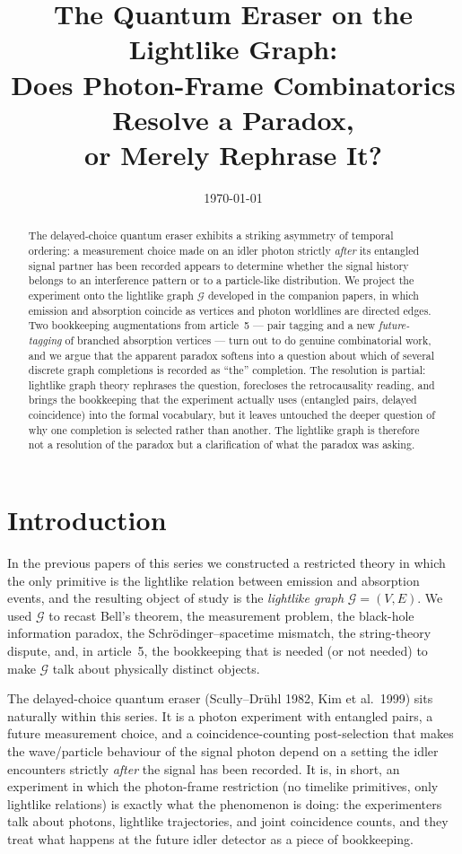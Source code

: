 \documentclass[11pt]{article}
\title{The Quantum Eraser on the Lightlike Graph:\\
Does Photon-Frame Combinatorics Resolve a Paradox,\\
or Merely Rephrase It?}
\date{\today}
\begin{document}
\maketitle

\begin{abstract}
The delayed-choice quantum eraser exhibits a striking asymmetry of temporal ordering: a measurement choice made on an idler photon strictly \emph{after} its entangled signal partner has been recorded appears to determine whether the signal history belongs to an interference pattern or to a particle-like distribution. We project the experiment onto the lightlike graph $\mathcal{G}$ developed in the companion papers, in which emission and absorption coincide as vertices and photon worldlines are directed edges. Two bookkeeping augmentations from article~5 --- pair tagging and a new \emph{future-tagging} of branched absorption vertices --- turn out to do genuine combinatorial work, and we argue that the apparent paradox softens into a question about which of several discrete graph completions is recorded as ``the'' completion. The resolution is partial: lightlike graph theory rephrases the question, forecloses the retrocausality reading, and brings the bookkeeping that the experiment actually uses (entangled pairs, delayed coincidence) into the formal vocabulary, but it leaves untouched the deeper question of why one completion is selected rather than another. The lightlike graph is therefore not a resolution of the paradox but a clarification of what the paradox was asking.
\end{abstract}

\section{Introduction}

In the previous papers of this series we constructed a restricted theory in which the only primitive is the lightlike relation between emission and absorption events, and the resulting object of study is the \emph{lightlike graph} $\mathcal{G} = (V, E)$. We used $\mathcal{G}$ to recast Bell's theorem, the measurement problem, the black-hole information paradox, the Schr\"odinger--spacetime mismatch, the string-theory dispute, and, in article~5, the bookkeeping that is needed (or not needed) to make $\mathcal{G}$ talk about physically distinct objects.

The delayed-choice quantum eraser (Scully--Dr\"uhl 1982, Kim et al.~1999) sits naturally within this series. It is a photon experiment with entangled pairs, a future measurement choice, and a coincidence-counting post-selection that makes the wave/particle behaviour of the signal photon depend on a setting the idler encounters strictly \emph{after} the signal has been recorded. It is, in short, an experiment in which the photon-frame restriction (no timelike primitives, only lightlike relations) is exactly what the phenomenon is doing: the experimenters talk about photons, lightlike trajectories, and joint coincidence counts, and they treat what happens at the future idler detector as a piece of bookkeeping.
\end{document}
